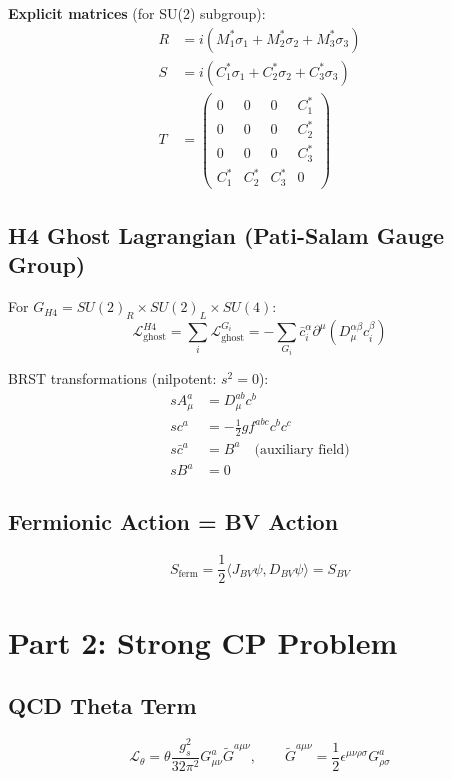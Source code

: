 \documentclass[11pt]{article}
\begin{document}
\textbf{Explicit matrices} (for SU(2) subgroup):
\begin{align}
R &= i\left(M_1^*\sigma_1 + M_2^*\sigma_2 + M_3^*\sigma_3\right) \\
S &= i\left(C_1^*\sigma_1 + C_2^*\sigma_2 + C_3^*\sigma_3\right) \\
T &= \begin{pmatrix} 0 & 0 & 0 & C_1^* \\ 0 & 0 & 0 & C_2^* \\ 0 & 0 & 0 & C_3^* \\ C_1^* & C_2^* & C_3^* & 0 \end{pmatrix}
\end{align}

\subsection{H4 Ghost Lagrangian (Pati-Salam Gauge Group)}
For $G_{H4} = SU(2)_R \times SU(2)_L \times SU(4)$:
\begin{equation}
\boxed{\mathcal{L}_{\text{ghost}}^{H4} = \sum_{i} \mathcal{L}_{\text{ghost}}^{G_i} = -\sum_{G_i} \bar{c}_i^\alpha \partial^\mu \left(D_\mu^{\alpha\beta} c_i^\beta\right)}
\end{equation}

BRST transformations (nilpotent: $s^2 = 0$):
\begin{align}
s A_\mu^a &= D_\mu^{ab} c^b \\
s c^a &= -\frac{1}{2} g f^{abc} c^b c^c \\
s \bar{c}^a &= B^a \quad \text{(auxiliary field)} \\
s B^a &= 0
\end{align}

\subsection{Fermionic Action = BV Action}
\begin{equation}
S_{\text{ferm}} = \frac{1}{2} \langle J_{BV}\psi, D_{BV}\psi \rangle = S_{BV}
\end{equation}

\section{Part 2: Strong CP Problem}

\subsection{QCD Theta Term}
\begin{equation}
\mathcal{L}_\theta = \theta \frac{g_s^2}{32\pi^2} G_{\mu\nu}^a \tilde{G}^{a\mu\nu}, \qquad \tilde{G}^{a\mu\nu} = \frac{1}{2}\epsilon^{\mu\nu\rho\sigma} G_{\rho\sigma}^a
\end{equation}
\end{document}
